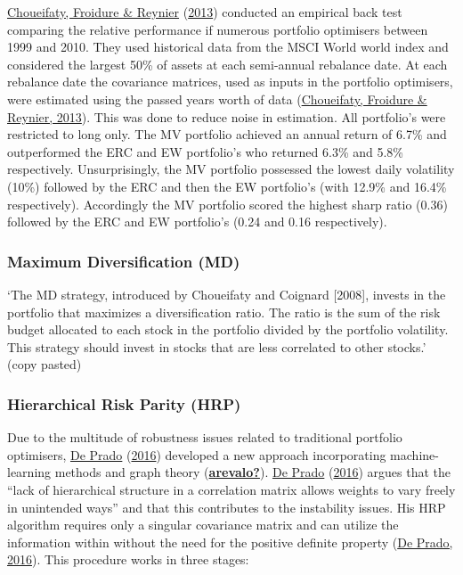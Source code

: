 \documentclass[11pt,preprint, authoryear]{elsarticle}
\numberwithin{equation}{section}
\numberwithin{figure}{section}
\numberwithin{table}{section}
\begin{document}
\protect\hyperlink{ref-choueifaty2013}{Choueifaty, Froidure \& Reynier}
(\protect\hyperlink{ref-choueifaty2013}{2013}) conducted an empirical
back test comparing the relative performance if numerous portfolio
optimisers between 1999 and 2010. They used historical data from the
MSCI World world index and considered the largest 50\% of assets at each
semi-annual rebalance date. At each rebalance date the covariance
matrices, used as inputs in the portfolio optimisers, were estimated
using the passed years worth of data
(\protect\hyperlink{ref-choueifaty2013}{Choueifaty, Froidure \& Reynier,
2013}). This was done to reduce noise in estimation. All portfolio's
were restricted to long only. The MV portfolio achieved an annual return
of 6.7\% and outperformed the ERC and EW portfolio's who returned 6.3\%
and 5.8\% respectively. Unsurprisingly, the MV portfolio possessed the
lowest daily volatility (10\%) followed by the ERC and then the EW
portfolio's (with 12.9\% and 16.4\% respectively). Accordingly the MV
portfolio scored the highest sharp ratio (0.36) followed by the ERC and
EW portfolio's (0.24 and 0.16 respectively).

\hypertarget{maximum-diversification-md}{%
\subsubsection{Maximum Diversification
(MD)}\label{maximum-diversification-md}}

`The MD strategy, introduced by Choueifaty and Coignard {[}2008{]},
invests in the portfolio that maximizes a diversification ratio. The
ratio is the sum of the risk budget allocated to each stock in the
portfolio divided by the portfolio volatility. This strategy should
invest in stocks that are less correlated to other stocks.' (copy
pasted)

\hypertarget{hierarchical-risk-parity-hrp}{%
\subsubsection{Hierarchical Risk Parity
(HRP)}\label{hierarchical-risk-parity-hrp}}

Due to the multitude of robustness issues related to traditional
portfolio optimisers, \protect\hyperlink{ref-lopez}{De Prado}
(\protect\hyperlink{ref-lopez}{2016}) developed a new approach
incorporating machine-learning methods and graph theory
(\protect\hyperlink{ref-arevalo}{\textbf{arevalo?}}).
\protect\hyperlink{ref-lopez}{De Prado}
(\protect\hyperlink{ref-lopez}{2016}) argues that the ``lack of
hierarchical structure in a correlation matrix allows weights to vary
freely in unintended ways'' and that this contributes to the instability
issues. His HRP algorithm requires only a singular covariance matrix and
can utilize the information within without the need for the positive
definite property (\protect\hyperlink{ref-lopez}{De Prado, 2016}). This
procedure works in three stages:
\end{document}

